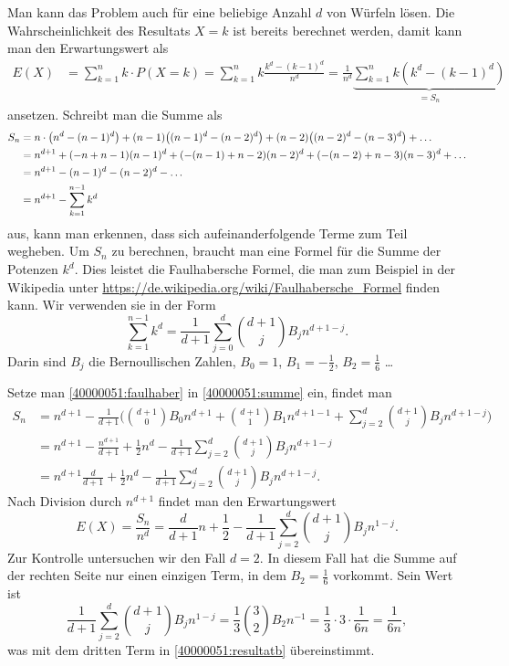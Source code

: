 \begin{diskussion}
Man kann das Problem auch für eine beliebige Anzahl $d$ von Würfeln
lösen.
Die Wahrscheinlichkeit des Resultats $X=k$ ist bereits berechnet werden,
damit kann man den Erwartungswert als
\begin{align*}
E(X)
&=
\sum_{k=1}^n
k \cdot P(X=k)
=
\sum_{k=1}^n k\frac{k^d-(k-1)^d}{n^d}
=
\frac{1}{n^d}
\underbrace{\sum_{k=1}^n k(k^d-(k-1)^d)}_{\displaystyle = S_n}
\end{align*}
ansetzen.
Schreibt man die Summe als
\begin{align}
S_n
&=
n\cdot\bigl(n^d-(n-1)^d\bigr)
+
(n-1)\bigl((n-1)^d - (n-2)^d\bigr)
+
(n-2)\bigl((n-2)^d - (n-3)^d\bigr)
+
\dots
\notag
\\
&=
n^{d+1}
+
(-n+n-1)(n-1)^d
+
(-(n-1)+n-2)(n-2)^d
+
(-(n-2)+n-3)(n-3)^d
+\dots
\notag
\\
&=
n^{d+1}
-
(n-1)^d - (n-2)^d - \dots
\notag
\\
&=
n^{d+1}
-
\sum_{k=1}^{n-1} k^d
\label{40000051:summe}
\end{align}
aus, kann man erkennen, dass sich aufeinanderfolgende
Terme zum Teil wegheben.
Um $S_n$ zu berechnen, braucht man eine Formel für die Summe der
Potenzen $k^d$.
Dies leistet die Faulhabersche Formel, die man zum Beispiel
in der Wikipedia unter
\url{https://de.wikipedia.org/wiki/Faulhabersche_Formel}
finden kann.
Wir verwenden sie in der Form
\begin{equation}
\sum_{k=1}^{n-1} k^d
=
\frac{1}{d+1}
\sum_{j=0}^d\binom{d+1}{j}B_j n^{d+1-j}.
\label{40000051:faulhaber}
\end{equation}
Darin sind $B_j$ die Bernoullischen Zahlen, $B_0=1$, $B_1=-\frac12$, $B_2=\frac16$ \dots

Setze man 
\eqref{40000051:faulhaber}
in
\eqref{40000051:summe}
ein, findet man
\begin{align*}
S_n
&=
n^{d+1}
-\frac1{d+1}\biggl(
\binom{d+1}{0} B_0n^{d+1}
+
\binom{d+1}{1} B_1n^{d+1-1}
+
\sum_{j=2}^d \binom{d+1}{j} B_j n^{d+1-j}
\biggr)
\\
&=
n^{d+1}-\frac{n^{d+1}}{d+1}
+
\frac{1}{2}n^d
-
\frac{1}{d+1}\sum_{j=2}^d\binom{d+1}{j}B_jn^{d+1-j}
\\
&=
n^{d+1}\frac{d}{d+1}
+
\frac{1}{2}n^d
-
\frac{1}{d+1}\sum_{j=2}^d\binom{d+1}{j}B_jn^{d+1-j}.
\end{align*}
Nach Division durch $n^{d+1}$ findet man den Erwartungswert
\[
E(X)
=
\frac{S_n}{n^d}
=
\frac{d}{d+1}
n
+
\frac12
-
\frac{1}{d+1}\sum_{j=2}^d\binom{d+1}{j}B_jn^{1-j}.
\]
Zur Kontrolle untersuchen wir den Fall $d=2$.
In diesem Fall hat die Summe auf der rechten Seite nur einen einzigen
Term, in dem $B_2=\frac16$ vorkommt.
Sein Wert ist
\[
\frac{1}{d+1}\sum_{j=2}^d\binom{d+1}{j}B_jn^{1-j}
=
\frac{1}{3}\binom{3}{2}B_2n^{-1}
=
\frac{1}{3}\cdot 3\cdot \frac1{6n}
=
\frac{1}{6n},
\]
was mit dem dritten Term in
\eqref{40000051:resultatb}
übereinstimmt.
\end{diskussion}


